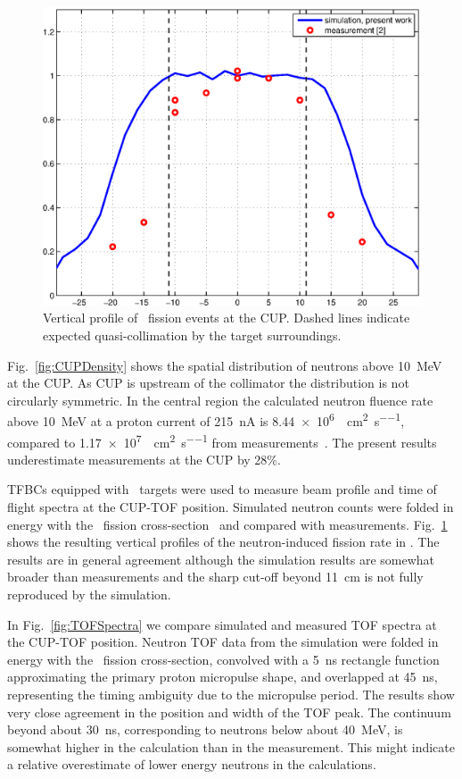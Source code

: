 \documentclass[peerreviewca,11pt,a4paper]{IEEEtran}
\let\MYoriglatexcaption\caption
\renewcommand{\caption}[2][\relax]{\MYoriglatexcaption[#2]{#2}}
\def\U238{\BPChem{\^{238}U}}
\begin{document}
\begin{figure}[!t]
    \centering
    \includegraphics[width=0.9\columnwidth]{CUPTOF10beamproRADECS.eps}
    \caption{
        Vertical profile of \U238\ fission events at the CUP.
        Dashed lines indicate expected quasi-collimation by the target surroundings.
    }
    \label{fig:CUPProfile}
\end{figure}

Fig.~\ref{fig:CUPDensity} shows the spatial distribution of neutrons above \SI{10}{\MeV} at the CUP.
As CUP is upstream of the collimator the distribution is not circularly symmetric.
In the central region the calculated neutron fluence rate above \SI{10}{\MeV} at a proton current of \SI{215}{\nA} is \SI{8.44e6}{\neutron\per\cm\squared\per\second}, compared to \SI{1.17e7}{\neutron\per\cm\squared\per\second} from measurements~\cite{Prokofiev2014}.
The present results underestimate measurements at the CUP by 28\%.

TFBCs equipped with \U238\ targets were used to measure beam profile and time of flight spectra at the CUP-TOF position.
Simulated neutron counts were folded in energy with the \U238\ fission cross-section~\cite{Carlson2009} and compared with measurements.
Fig.~\ref{fig:CUPProfile} shows the resulting vertical profiles of the neutron-induced fission rate in \U238.
The results are in general agreement although the simulation results are somewhat broader than measurements and the sharp cut-off beyond \SI{11}{\cm} is not fully reproduced by the simulation.

In Fig.~\ref{fig:TOFSpectra} we compare simulated and measured TOF spectra at the CUP-TOF position.
Neutron TOF data from the simulation were folded in energy with the \U238\ fission cross-section, convolved with a \SI{5}{\ns} rectangle function approximating the primary proton micropulse shape, and overlapped at \SI{45}{\ns}, representing the timing ambiguity due to the micropulse period.
The results show very close agreement in the position and width of the TOF peak.
The continuum beyond about \SI{30}{\ns}, corresponding to neutrons below about \SI{40}{\MeV}, is somewhat higher in the calculation than in the measurement.
This might indicate a relative overestimate of lower energy neutrons in the calculations.
\end{document}
